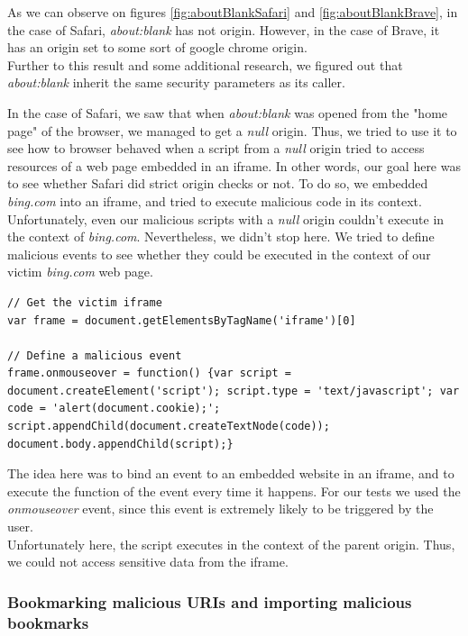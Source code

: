 \documentclass[journal]{IEEEtran}
\begin{document}
As we can observe on figures \ref{fig:aboutBlankSafari} and \ref{fig:aboutBlankBrave}, in the case of Safari, \emph{about:blank} has not origin. However, in the case of Brave, it has an origin set to some sort of google chrome origin. \\

Further to this result and some additional research, we figured out that \emph{about:blank} inherit the same security parameters as its caller.

\medskip

In the case of Safari, we saw that when \emph{about:blank} was opened from the "home page" of the browser, we managed to get a \emph{null} origin. Thus, we tried to use it to see how to browser behaved when a script from a \emph{null} origin tried to access resources of a web page embedded in an iframe. In other words, our goal here was to see whether Safari did strict origin checks or not. To do so, we embedded \emph{bing.com} into an iframe, and tried to execute malicious code in its context.\\

Unfortunately, even our malicious scripts with a \emph{null} origin couldn't execute in the context of \emph{bing.com}. Nevertheless, we didn't stop here. We tried to define malicious events to see whether they could be executed in the context of our victim \emph{bing.com} web page.

\begin{lstlisting}[caption=Our attempt to define malicious event on an embbeded victim web page, label={listing:maliciousEvent}]
// Get the victim iframe
var frame = document.getElementsByTagName('iframe')[0]

// Define a malicious event 
frame.onmouseover = function() {var script = document.createElement('script'); script.type = 'text/javascript'; var code = 'alert(document.cookie);'; script.appendChild(document.createTextNode(code)); document.body.appendChild(script);}
\end{lstlisting}

The idea here was to bind an event to an embedded website in an iframe, and to execute the function of the event every time it happens. For our tests we used the \emph{onmouseover} event, since this event is extremely likely to be triggered by the user. \\
Unfortunately here, the script executes in the context of the parent origin. Thus, we could not access sensitive data from the iframe.


\subsubsection*{Bookmarking malicious URIs and importing malicious bookmarks}
\end{document}
